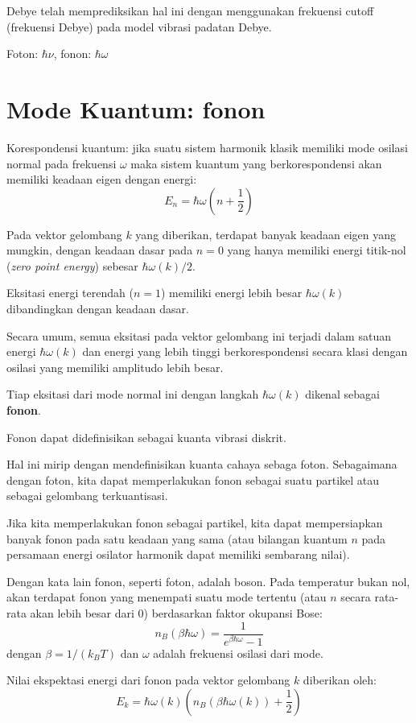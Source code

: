 Debye telah memprediksikan hal ini dengan menggunakan frekuensi cutoff
(frekuensi Debye) pada model vibrasi padatan Debye.

Foton: \(\hbar \nu\), fonon: \(\hbar \omega\)

\section{Mode Kuantum: fonon}

Korespondensi kuantum: jika suatu sistem harmonik klasik memiliki mode
osilasi normal pada frekuensi \(\omega\) maka sistem kuantum yang
berkorespondensi akan memiliki keadaan eigen dengan energi: \[
E_{n} = \hbar \omega \left( n + \frac{1}{2} \right)
\]

Pada vektor gelombang \(k\) yang diberikan, terdapat banyak keadaan
eigen yang mungkin, dengan keadaan dasar pada \(n=0\) yang hanya
memiliki energi titik-nol (\emph{zero point energy}) sebesar
\(\hbar \omega(k)/2\).

Eksitasi energi terendah (\(n=1\)) memiliki energi lebih besar
\(\hbar\omega(k)\) dibandingkan dengan keadaan dasar.

Secara umum, semua eksitasi pada vektor gelombang ini terjadi dalam
satuan energi \(\hbar\omega(k)\) dan energi yang lebih tinggi
berkorespondensi secara klasi dengan osilasi yang memiliki amplitudo
lebih besar.

Tiap eksitasi dari mode normal ini dengan langkah \(\hbar\omega(k)\)
dikenal sebagai \textbf{fonon}.

Fonon dapat didefinisikan sebagai kuanta vibrasi diskrit.

Hal ini mirip dengan mendefinisikan kuanta cahaya sebaga foton.
Sebagaimana dengan foton, kita dapat memperlakukan fonon sebagai suatu
partikel atau sebagai gelombang terkuantisasi.

Jika kita memperlakukan fonon sebagai partikel, kita dapat mempersiapkan
banyak fonon pada satu keadaan yang sama (atau bilangan kuantum \(n\)
pada persamaan energi osilator harmonik dapat memiliki sembarang nilai).

Dengan kata lain fonon, seperti foton, adalah boson. Pada temperatur
bukan nol, akan terdapat fonon yang menempati suatu mode tertentu (atau
\(n\) secara rata-rata akan lebih besar dari 0) berdasarkan faktor
okupansi Bose: \[
n_{B}(\beta\hbar\omega) = \frac{1}{e^{\beta\hbar\omega} - 1}
\] dengan \(\beta = 1/(k_{B}T)\) dan \(\omega\) adalah frekuensi osilasi
dari mode.

Nilai ekspektasi energi dari fonon pada vektor gelombang \(k\) diberikan
oleh: \[
E_{k} = \hbar\omega(k)\left(
n_{B}(\beta\hbar\omega(k)) + \frac{1}{2}
\right)
\]

